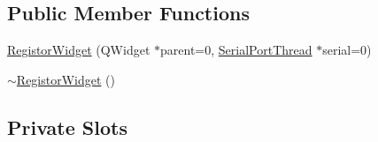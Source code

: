\subsection*{Public Member Functions}
\begin{DoxyCompactItemize}
\item 
\mbox{\hyperlink{class_registor_widget_a7ad3194e0daa68d5498692065e52194a}{Registor\+Widget}} (Q\+Widget $\ast$parent=0, \mbox{\hyperlink{class_serial_port_thread}{Serial\+Port\+Thread}} $\ast$serial=0)
\item 
\mbox{\hyperlink{class_registor_widget_a066b7812f556e83709a410e8d092dd8f}{$\sim$\+Registor\+Widget}} ()
\end{DoxyCompactItemize}
\subsection*{Private Slots}
